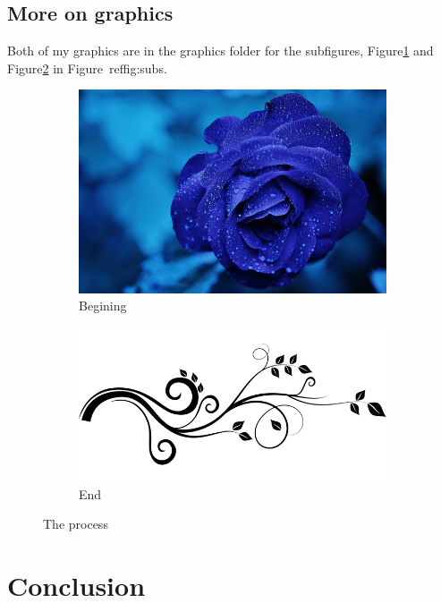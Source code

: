 \documentclass{proc}
\begin{document}
	
	\subsection{More on graphics}
	Both of my graphics are in the graphics folder for the subfigures, Figure\ref{fig:paper} and Figure\ref{fig:page} in Figure~ref{fig:subs}.
	
	\begin{figure}[htbp]
			\centering
			\begin{subfigure}[b]{0.2\textwidth}
				\centering
				\includegraphics[scale=.1]{one.jpg}
				\caption{Begining}
				\label{fig:paper}
			\end{subfigure}
			\centering
			\begin{subfigure}[b]{0.2\textwidth}
				\centering
				\includegraphics[scale=.3]{two.png}
				\caption{End}
				\label{fig:page}
			\end{subfigure}
			\caption{The process}
			\label{fig:subs}
	\end{figure}
	
	\section{Conclusion}
	
	
\end{document}
